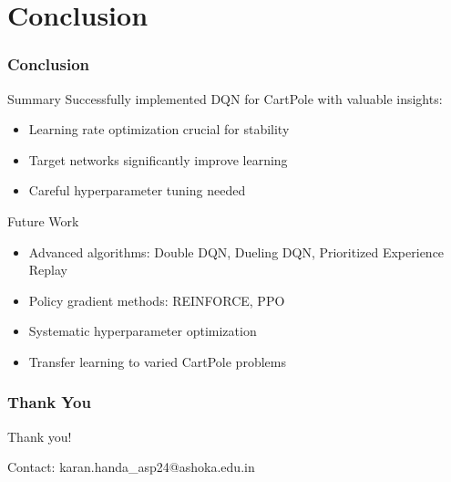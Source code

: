 \documentclass[
    9pt,
    aspectratio=169,
]{beamer}
\begin{document}
\section{Conclusion}

\begin{frame}
\frametitle{Conclusion}
\begin{block}{Summary}
    Successfully implemented DQN for CartPole with valuable insights:
    \begin{itemize}
        \item Learning rate optimization crucial for stability
        \item Target networks significantly improve learning
        \item Careful hyperparameter tuning needed
    \end{itemize}
\end{block}

\begin{block}{Future Work}
    \begin{itemize}
        \item Advanced algorithms: Double DQN, Dueling DQN, Prioritized Experience Replay
        \item Policy gradient methods: REINFORCE, PPO
        \item Systematic hyperparameter optimization
        \item Transfer learning to varied CartPole problems
    \end{itemize}
\end{block}
\end{frame}

\begin{frame}
\frametitle{Thank You}
\begin{center}
\Large Thank you!

\bigskip
\normalsize
Contact: karan.handa\_asp24@ashoka.edu.in
\end{center}
\end{frame}
\end{document}
